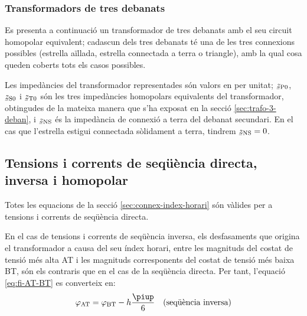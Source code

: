 \begin{center}
    
\end{center}


\subsubsection{Transformadors de tres debanats}\label{sec:cir-hom-3-deb}

Es presenta a continuació un transformador de tres debanats amb el seu circuit homopolar equivalent; cadascun dels tres debanats té una de les tres connexions possibles (estrella aïllada, estrella connectada a terra o triangle), amb la qual cosa queden coberts tots els casos possibles.

Les impedàncies del transformador representades són valors en per unitat; $\cmplx{z}\ped{P0}$, $\cmplx{z}\ped{S0}$ i $\cmplx{z}\ped{T0}$ són les tres impedàncies homopolars equivalents del transformador, obtingudes de la mateixa manera que s'ha exposat en la secció \ref{sec:trafo-3-deban}, i $\cmplx{z}\ped{NS}$ és  la impedància de connexió a terra del debanat secundari. En el cas que l'estrella estigui connectada sòlidament a terra, tindrem $\cmplx{z}\ped{NS}=0$.

\begin{center}
    
\end{center}


\subsection{Tensions i corrents de seqüència directa, inversa i homopolar}

Totes les equacions de la secció \vref{sec:connex-index-horari} són vàlides per a tensions i corrents de seqüència directa.

En el cas de tensions i corrents de seqüència inversa, els desfasaments que origina el transformador a causa del seu índex horari, entre les magnituds  del costat de tensió més alta AT i les magnituds corresponents del costat de tensió més baixa BT, són els contraris que en el cas de la seqüència directa. Per tant, l'equació  \eqref{eq:fi-AT-BT} es converteix en:
\begin{equation}
    \varphi\ped{AT} = \varphi\ped{BT} - h\frac{\piup}{6} \quad\text{(seqüència inversa)}
\end{equation}


